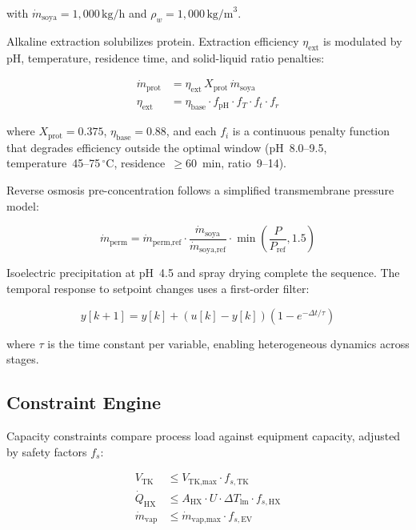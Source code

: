 \documentclass[10pt]{article}
\begin{document}
with $\dot{m}_{\text{soya}} = 1{,}000\,\text{kg/h}$ and $\rho_w = 1{,}000\,\text{kg/m}^3$.

Alkaline extraction solubilizes protein. Extraction efficiency $\eta_{\text{ext}}$ is modulated by pH, temperature, residence time, and solid-liquid ratio penalties:

\begin{align}
\dot{m}_{\text{prot}} &= \eta_{\text{ext}} \, X_{\text{prot}} \, \dot{m}_{\text{soya}} \label{eq:stage1} \\
\eta_{\text{ext}} &= \eta_{\text{base}} \cdot f_{\text{pH}} \cdot f_T \cdot f_t \cdot f_r \label{eq:eff}
\end{align}

where $X_{\text{prot}} = 0.375$, $\eta_{\text{base}} = 0.88$, and each $f_i$ is a continuous penalty function that degrades efficiency outside the optimal window (pH~8.0--9.5, temperature~45--75$\,^\circ$C, residence~$\geq$60~min, ratio~9--14).

Reverse osmosis pre-concentration follows a simplified transmembrane pressure model:

\begin{equation}
\dot{m}_{\text{perm}} = \dot{m}_{\text{perm,ref}} \cdot \frac{\dot{m}_{\text{soya}}}{\dot{m}_{\text{soya,ref}}} \cdot \min\left(\frac{P}{P_{\text{ref}}}, 1.5\right) \label{eq:ro}
\end{equation}

Isoelectric precipitation at pH~4.5 and spray drying complete the sequence. The temporal response to setpoint changes uses a first-order filter:

\begin{equation}
y[k+1] = y[k] + (u[k] - y[k])(1 - e^{-\Delta t / \tau}) \label{eq:inertia}
\end{equation}

where $\tau$ is the time constant per variable, enabling heterogeneous dynamics across stages.

\subsection{Constraint Engine}

Capacity constraints compare process load against equipment capacity, adjusted by safety factors $f_s$:

\begin{align}
V_{\text{TK}} &\leq V_{\text{TK,max}} \cdot f_{s,\text{TK}} \label{eq:c1} \\
\dot{Q}_{\text{HX}} &\leq A_{\text{HX}} \cdot U \cdot \Delta T_{\text{lm}} \cdot f_{s,\text{HX}} \label{eq:c2} \\
\dot{m}_{\text{vap}} &\leq \dot{m}_{\text{vap,max}} \cdot f_{s,\text{EV}} \label{eq:c3}
\end{align}
\end{document}
